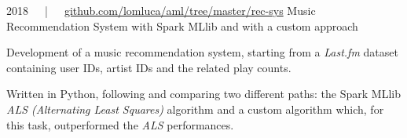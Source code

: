 \begin{cventries}
	

	\cvproj
        {2018~~~|~~~\href{https://github.com/lomluca/aml/tree/master/rec-sys}{github.com/lomluca/aml/tree/master/rec-sys}}
        {Music Recommendation System with Spark MLlib and with a custom approach}
        {}
        {}
        {
            \begin{cvitems} %
                \item {Development of a music recommendation system, starting from a \textit{Last.fm} dataset containing user IDs, artist IDs and the related play counts.}
                \item {Written in Python, following and comparing two different paths: the Spark MLlib \textit{ALS (Alternating Least Squares)} algorithm and a custom algorithm which, for this task, outperformed the \textit{ALS} performances.}
            \end{cvitems}
        }
\end{cventries}
